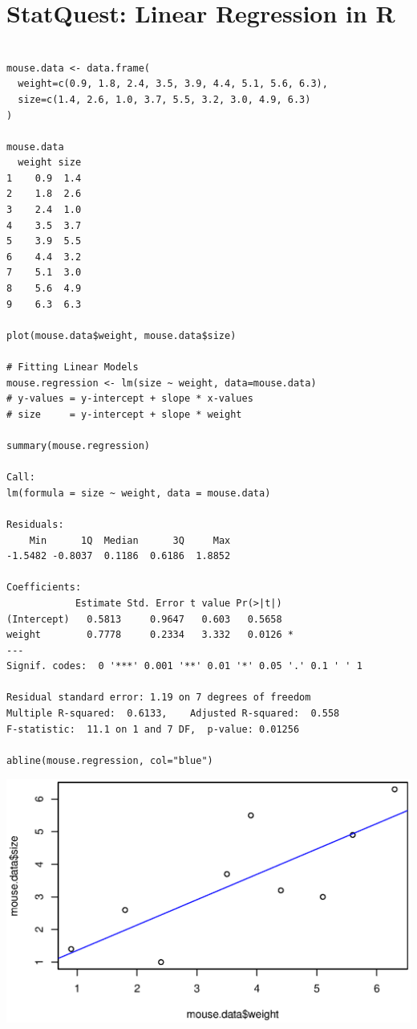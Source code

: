 \documentclass[
	final,
	a4paper,
	oneside,
	parskip=full,
	headings=standardclasses,
	headings=big,
	pointednumbers
]{scrartcl}
\begin{document}
    \section*{StatQuest: Linear Regression in R}
\begin{lstlisting}

mouse.data <- data.frame(
  weight=c(0.9, 1.8, 2.4, 3.5, 3.9, 4.4, 5.1, 5.6, 6.3),
  size=c(1.4, 2.6, 1.0, 3.7, 5.5, 3.2, 3.0, 4.9, 6.3)
)

mouse.data
  weight size
1    0.9  1.4
2    1.8  2.6
3    2.4  1.0
4    3.5  3.7
5    3.9  5.5
6    4.4  3.2
7    5.1  3.0
8    5.6  4.9
9    6.3  6.3

plot(mouse.data$weight, mouse.data$size)

# Fitting Linear Models
mouse.regression <- lm(size ~ weight, data=mouse.data)
# y-values = y-intercept + slope * x-values
# size     = y-intercept + slope * weight

summary(mouse.regression)

Call:
lm(formula = size ~ weight, data = mouse.data)

Residuals:
    Min      1Q  Median      3Q     Max 
-1.5482 -0.8037  0.1186  0.6186  1.8852 

Coefficients:
            Estimate Std. Error t value Pr(>|t|)  
(Intercept)   0.5813     0.9647   0.603   0.5658  
weight        0.7778     0.2334   3.332   0.0126 *
---
Signif. codes:  0 '***' 0.001 '**' 0.01 '*' 0.05 '.' 0.1 ' ' 1

Residual standard error: 1.19 on 7 degrees of freedom
Multiple R-squared:  0.6133,	Adjusted R-squared:  0.558 
F-statistic:  11.1 on 1 and 7 DF,  p-value: 0.01256

abline(mouse.regression, col="blue")

\end{lstlisting}


    \begin{center}
        \includegraphics[width=16cm]{StatQuest_Linear_Regression_in_R_plot.eps}
    \end{center}
    
    
    
\end{document}
